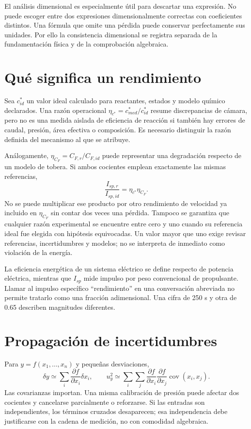 El análisis dimensional es especialmente útil para descartar una expresión. No puede escoger entre dos expresiones dimensionalmente correctas con coeficientes distintos. Una fórmula que omite una pérdida puede conservar perfectamente sus unidades. Por ello la consistencia dimensional se registra separada de la fundamentación física y de la comprobación algebraica.
\section{Qué significa un rendimiento}
Sea $c^*_{id}$ un valor ideal calculado para reactantes, estados y modelo químico declarados. Una razón operacional $\eta_{c^*}=c^*_{med}/c^*_{id}$ resume discrepancias de cámara, pero no es una medida aislada de eficiencia de reacción si también hay errores de caudal, presión, área efectiva o composición. Es necesario distinguir la razón definida del mecanismo al que se atribuye.

Análogamente, $\eta_{C_F}=C_{F,r}/C_{F,id}$ puede representar una degradación respecto de un modelo de tobera. Si ambos cocientes emplean exactamente las mismas referencias,
\[\frac{I_{sp,r}}{I_{sp,id}}=\eta_{c^*}\eta_{C_F}.\]
No se puede multiplicar ese producto por otro rendimiento de velocidad ya incluido en $\eta_{C_F}$ sin contar dos veces una pérdida. Tampoco se garantiza que cualquier razón experimental se encuentre entre cero y uno cuando su referencia ideal fue elegida con hipótesis equivocadas. Un valor mayor que uno exige revisar referencias, incertidumbres y modelos; no se interpreta de inmediato como violación de la energía.

La eficiencia energética de un sistema eléctrico se define respecto de potencia eléctrica, mientras que $I_{sp}$ mide impulso por peso convencional de propulsante. Llamar al impulso específico ``rendimiento'' en una conversación abreviada no permite tratarlo como una fracción adimensional. Una cifra de 250 s y otra de 0.65 describen magnitudes diferentes.
\section{Propagación de incertidumbres}
Para $y=f(x_1,\ldots,x_n)$ y pequeñas desviaciones,
\begin{equation}
 \delta y\simeq\sum_i\frac{\partial f}{\partial x_i}\delta x_i,
 \qquad u_y^2\simeq\sum_i\sum_j\frac{\partial f}{\partial x_i}
 \frac{\partial f}{\partial x_j}\operatorname{cov}(x_i,x_j).
\end{equation}
Las covarianzas importan. Una misma calibración de presión puede afectar dos cocientes y cancelarse parcialmente o reforzarse. Si las entradas son independientes, los términos cruzados desaparecen; esa independencia debe justificarse con la cadena de medición, no con comodidad algebraica.

